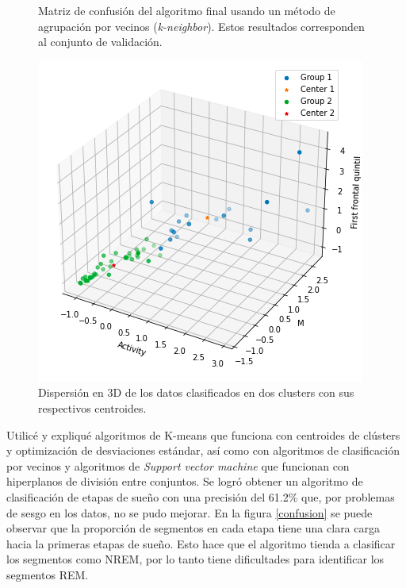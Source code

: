 \documentclass[11pt,letterpaper]{article}
\begin{document}
\begin{flushleft}
\begin{figure}[H]
\begin{minipage}{.48\linewidth}
	\caption{\footnotesize{ Matriz de confusión del algoritmo final usando un método de agrupación por vecinos (\textit{k-neighbor}). Estos resultados corresponden al conjunto de validación.}}
	\label{confusion}
\end{minipage}
\hfill
\begin{minipage}{.48\linewidth}
\includegraphics[width=\linewidth]{Disp.png} 
\caption{\footnotesize{Dispersión en 3D de los datos clasificados en dos clusters con sus respectivos centroides.}}
\label{disp}
\end{minipage}
\end{figure}
Utilicé y expliqué algoritmos de K-means que funciona con centroides de clústers y optimización de desviaciones estándar, así como con algoritmos de clasificación por vecinos y algoritmos de \textit{Support vector machine} que funcionan con hiperplanos de división entre conjuntos. Se logró obtener un algoritmo de clasificación de etapas de sueño con una precisión del 61.2\% que, por problemas de sesgo en los datos, no se pudo mejorar. En la figura \ref{confusion} se puede observar que la proporción de segmentos en cada etapa tiene una clara carga hacia la primeras etapas de sueño. Esto hace que el algoritmo tienda a clasificar los segmentos como NREM, por lo tanto tiene dificultades para identificar los segmentos REM. \\
\hfill \\

\end{flushleft}
\end{document}
